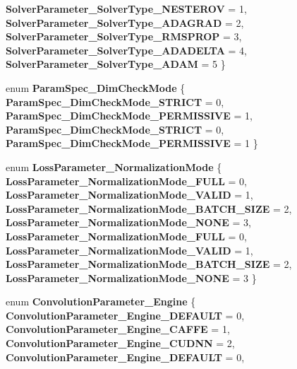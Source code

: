 \begin{DoxyCompactItemize}
{\bfseries Solver\+Parameter\+\_\+\+Solver\+Type\+\_\+\+N\+E\+S\+T\+E\+R\+OV} = 1, 
\newline
{\bfseries Solver\+Parameter\+\_\+\+Solver\+Type\+\_\+\+A\+D\+A\+G\+R\+AD} = 2, 
{\bfseries Solver\+Parameter\+\_\+\+Solver\+Type\+\_\+\+R\+M\+S\+P\+R\+OP} = 3, 
{\bfseries Solver\+Parameter\+\_\+\+Solver\+Type\+\_\+\+A\+D\+A\+D\+E\+L\+TA} = 4, 
{\bfseries Solver\+Parameter\+\_\+\+Solver\+Type\+\_\+\+A\+D\+AM} = 5
 \}
\item 
\mbox{\label{namespacecaffe_a2636d2f307d34114fc237f3b126b8621}} 
enum {\bfseries Param\+Spec\+\_\+\+Dim\+Check\+Mode} \{ {\bfseries Param\+Spec\+\_\+\+Dim\+Check\+Mode\+\_\+\+S\+T\+R\+I\+CT} = 0, 
{\bfseries Param\+Spec\+\_\+\+Dim\+Check\+Mode\+\_\+\+P\+E\+R\+M\+I\+S\+S\+I\+VE} = 1, 
{\bfseries Param\+Spec\+\_\+\+Dim\+Check\+Mode\+\_\+\+S\+T\+R\+I\+CT} = 0, 
{\bfseries Param\+Spec\+\_\+\+Dim\+Check\+Mode\+\_\+\+P\+E\+R\+M\+I\+S\+S\+I\+VE} = 1
 \}
\item 
\mbox{\label{namespacecaffe_a8a23c4d583bae44f37cde544258f64f1}} 
enum {\bfseries Loss\+Parameter\+\_\+\+Normalization\+Mode} \{ \newline
{\bfseries Loss\+Parameter\+\_\+\+Normalization\+Mode\+\_\+\+F\+U\+LL} = 0, 
{\bfseries Loss\+Parameter\+\_\+\+Normalization\+Mode\+\_\+\+V\+A\+L\+ID} = 1, 
{\bfseries Loss\+Parameter\+\_\+\+Normalization\+Mode\+\_\+\+B\+A\+T\+C\+H\+\_\+\+S\+I\+ZE} = 2, 
{\bfseries Loss\+Parameter\+\_\+\+Normalization\+Mode\+\_\+\+N\+O\+NE} = 3, 
\newline
{\bfseries Loss\+Parameter\+\_\+\+Normalization\+Mode\+\_\+\+F\+U\+LL} = 0, 
{\bfseries Loss\+Parameter\+\_\+\+Normalization\+Mode\+\_\+\+V\+A\+L\+ID} = 1, 
{\bfseries Loss\+Parameter\+\_\+\+Normalization\+Mode\+\_\+\+B\+A\+T\+C\+H\+\_\+\+S\+I\+ZE} = 2, 
{\bfseries Loss\+Parameter\+\_\+\+Normalization\+Mode\+\_\+\+N\+O\+NE} = 3
 \}
\item 
\mbox{\label{namespacecaffe_a145aa96a13113269aa86ea0bdf704348}} 
enum {\bfseries Convolution\+Parameter\+\_\+\+Engine} \{ \newline
{\bfseries Convolution\+Parameter\+\_\+\+Engine\+\_\+\+D\+E\+F\+A\+U\+LT} = 0, 
{\bfseries Convolution\+Parameter\+\_\+\+Engine\+\_\+\+C\+A\+F\+FE} = 1, 
{\bfseries Convolution\+Parameter\+\_\+\+Engine\+\_\+\+C\+U\+D\+NN} = 2, 
{\bfseries Convolution\+Parameter\+\_\+\+Engine\+\_\+\+D\+E\+F\+A\+U\+LT} = 0, 

\end{DoxyCompactItemize}
